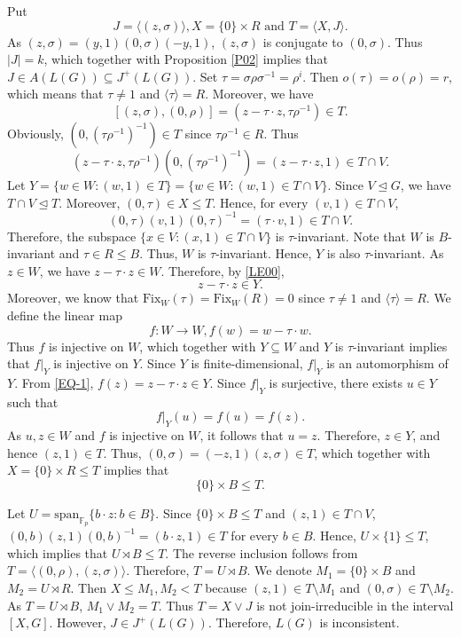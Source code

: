 \documentclass[12pt]{article}
\def\QEDopen{{\setlength{\fboxsep}{0pt}\setlength{\fboxrule}{0.2pt}\fbox{\rule[0pt]{0pt}{1.3ex}\rule[0pt]{1.3ex}{0pt}}}}
\def\QED{\QEDopen}
\def\endproof{\hspace*{\fill}~\QED\par\endtrivlist\unskip}
\begin{document}
Put $$J=\langle(z,\sigma)\rangle, X=\{0\}\times R\mbox{ and }T=\langle X,J\rangle.$$
As $(z,\sigma)=(y,1)(0,\sigma)(-y,1)$, $(z,\sigma)$ is conjugate to $(0,\sigma)$. Thus $|J|=k$, which together with Proposition \ref{P02} implies that $J\in A(L(G))\subseteq J^+(L(G))$. Set $\tau=\sigma\rho\sigma^{-1}=\rho^i$. Then 
$o(\tau)=o(\rho)=r$, which means that $\tau\neq 1$ and $\langle\tau\rangle=R$. Moreover, we have 
$$[(z,\sigma),(0,\rho)]=(z-\tau\cdot z,\tau\rho^{-1})\in T.$$
Obviously, $(0,(\tau\rho^{-1})^{-1})\in T$ since $\tau\rho^{-1}\in R$.
Thus
\begin{equation}\label{LE00}
(z-\tau\cdot z,\tau\rho^{-1})(0,(\tau\rho^{-1})^{-1})=(z-\tau\cdot z,1)\in T\cap V. \end{equation}
Let $Y=\{w\in W: (w, 1)\in T\}=\{w\in W: (w, 1)\in T\cap V\}$. 
Since $V\trianglelefteq G$, we have
$T\cap V\trianglelefteq T$.
Moreover, $(0,\tau)\in X\leq T$. Hence, for every $(v,1)\in T\cap V$,
$$(0,\tau)(v,1)(0,\tau)^{-1}=(\tau\cdot v,1)\in T\cap V.$$
Therefore, the subspace $\{x\in V: (x,1)\in T\cap V\}$ is $\tau$-invariant. 
Note that $W$ is $B$-invariant and $\tau\in R\leq B$. Thus, $W$ is $\tau$-invariant.
Hence, $Y$ is also $\tau$-invariant. As $z\in W$, we have $z-\tau\cdot z\in W$. Therefore, by \eqref{LE00}, 
\begin{equation}\label{EQ-1}
z-\tau\cdot z \in Y.   
\end{equation}
Moreover, we know that $\mbox{Fix}_W(\tau)=\mbox{Fix}_W(R)=0$ since $\tau\neq 1$ and $\langle\tau\rangle=R$. 
We define the linear map $$f:W\longrightarrow W, f(w)=w-\tau\cdot w.$$
Thus $f$ is injective on $W$, which together with $Y\subseteq W$ and $Y$ is $\tau$-invariant implies that $f|_Y$ is injective on $Y$. Since $Y$ is 
finite-dimensional, $f|_Y$ is an automorphism of $Y$. From \eqref{EQ-1}, 
$f(z)=z-\tau \cdot z\in Y$. Since $f|_Y$ is surjective, 
there exists $u\in Y$ such that $$f|_Y(u)=f(u)=f(z).$$
As $u, z\in W$ and $f$ is injective on $W$, it follows that $u=z$. 
Therefore, $z\in Y$, and hence $(z, 1)\in T$. Thus, $(0,\sigma)=(-z,1)(z,\sigma)\in T$, which together with $X=\{0\}\times R\leq T$ implies that $$\{0\}\times B\leq T.$$

Let $U=\mbox{span}_{\mathbb{F}_p}\{b\cdot z: b\in B\}$. 
Since $\{0\}\times B\leq T$ and $(z,1)\in T\cap V$,  
$(0,b)(z,1)(0,b)^{-1}=(b\cdot z,1)\in T$ for every $b\in B$. 
Hence, $U\times \{1\}\leq T$, which implies that $U\rtimes B\leq T$. 
The reverse inclusion follows from
$T=\langle(0,\rho),(z,\sigma)\rangle$.
Therefore, $T=U\rtimes B$. We denote $M_1=\{0\}\times B$ and $M_2=U\rtimes R$.
Then $X\leq M_1, M_2<T$ because $(z, 1)\in T\setminus M_1$ and $(0,\sigma)\in T\setminus M_2$. As $T=U\rtimes B$, $M_1\vee M_2=T$. Thus $T=X\vee J$ is 
not join-irreducible in the interval $[X,G]$. However, $J\in J^+(L(G))$. Therefore, $L(G)$ is inconsistent.
\endproof
\end{document}
